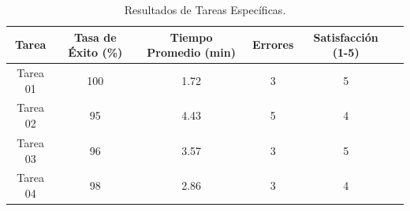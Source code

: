 \begin{table}[H]
    \centering
    \caption{Resultados de Tareas Específicas.}
    \label{tab:tareasEspecificas}
    \begin{tabular}{|c|c|c|c|c|c|}
        \hline
        \rowcolor{gray!50}
        \textbf{Tarea} & \textbf{Tasa de Éxito (\%)} & \textbf{Tiempo Promedio (min)} & \textbf{Errores} & \textbf{Satisfacción (1-5)} \\
        \hline
        Tarea 01 & 100 & 1.72 & 3 & 5 \\
        \hline
        Tarea 02 & 95 & 4.43 & 5 & 4 \\
        \hline
        Tarea 03 & 96 & 3.57 & 3 & 5 \\
        \hline
        Tarea 04 & 98 & 2.86 & 3 & 4 \\
        \hline
    \end{tabular}
\end{table}